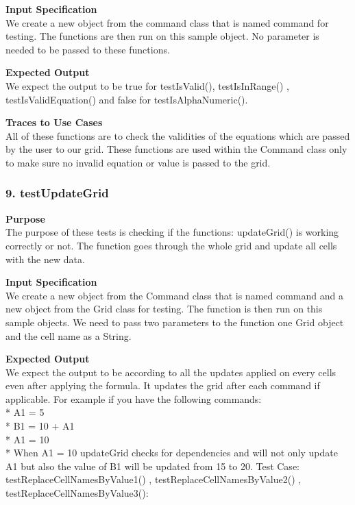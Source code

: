 \documentclass[12pt]{article}
\begin{document}
\noindent
{\bf Input Specification}\\
We create a new object from the command class that is named command for testing. The functions are then run on this sample object. No parameter is needed to be passed to these functions.  

\noindent
{\bf Expected Output}\\
We expect the output to be true for testIsValid(), testIsInRange() , testIsValidEquation() and false for  testIsAlphaNumeric().

\noindent
{\bf Traces to Use Cases}\\
All of these functions are to check the validities of the equations which are passed by the user to our grid. These functions are used within the Command class only to make sure no invalid equation or value is passed to the grid. 

\subsubsection{9. testUpdateGrid} \label{tc:1}

\noindent
{\bf Purpose}\\
The purpose of these tests is checking if the functions: updateGrid() is working correctly or not. The function goes through the whole grid and update all cells with the new data.

\noindent
{\bf Input Specification}\\
We create a new object from the Command class that is named command and a new object from the Grid class for testing. The function is then run on this sample objects. We need to pass two parameters to the function one Grid object and the cell name as a String. 

\noindent
{\bf Expected Output}\\
We expect the output to be according to all the updates applied on every cells even after applying the formula. It updates the grid after each command if applicable. For example if you have the following commands:\\*
A1 = 5\\*
B1 = 10 + A1\\*
A1 = 10\\*
When A1 = 10 updateGrid checks for dependencies and will not only update A1 but also the value of B1 will be updated from 15 to 20.
Test Case: testReplaceCellNamesByValue1() , testReplaceCellNamesByValue2() , testReplaceCellNamesByValue3():
\end{document}
